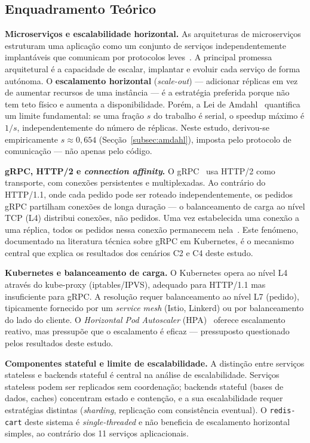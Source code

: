 \documentclass[acmsmall,screen=true,nonacm]{acmart}
\begin{document}
\subsection{Enquadramento Teórico}
\label{sec:teoria}

\textbf{Microserviços e escalabilidade horizontal.} As arquiteturas de microserviços estruturam uma aplicação como um conjunto de serviços independentemente implantáveis que comunicam por protocolos leves~\cite{fowler,newman}. A principal promessa arquitetural é a capacidade de escalar, implantar e evoluir cada serviço de forma autónoma. O \textbf{escalamento horizontal} (\textit{scale-out}) — adicionar réplicas em vez de aumentar recursos de uma instância — é a estratégia preferida porque não tem teto físico e aumenta a disponibilidade. Porém, a Lei de Amdahl~\cite{amdahl} quantifica um limite fundamental: se uma fração $s$ do trabalho é serial, o speedup máximo é $1/s$, independentemente do número de réplicas. Neste estudo, derivou-se empiricamente $s \approx 0{,}654$ (Secção~\ref{subsec:amdahl}), imposta pelo protocolo de comunicação — não apenas pelo código.

\textbf{gRPC, HTTP/2 e \textit{connection affinity}.} O gRPC~\cite{grpc} usa HTTP/2 como transporte, com conexões persistentes e multiplexadas. Ao contrário do HTTP/1.1, onde cada pedido pode ser roteado independentemente, os pedidos gRPC partilham conexões de longa duração — o balanceamento de carga ao nível TCP (L4) distribui conexões, não pedidos. Uma vez estabelecida uma conexão a uma réplica, todos os pedidos nessa conexão permanecem nela~\cite{grpcloadbalancing,k8sgrpc}. Este fenómeno, documentado na literatura técnica sobre gRPC em Kubernetes, é o mecanismo central que explica os resultados dos cenários C2 e C4 deste estudo.

\textbf{Kubernetes e balanceamento de carga.} O Kubernetes opera ao nível L4 através do kube-proxy (iptables/IPVS), adequado para HTTP/1.1 mas insuficiente para gRPC. A resolução requer balanceamento ao nível L7 (pedido), tipicamente fornecido por um \textit{service mesh} (Istio, Linkerd) ou por balanceamento do lado do cliente. O \textit{Horizontal Pod Autoscaler} (HPA)~\cite{k8shpa} oferece escalamento reativo, mas pressupõe que o escalamento é eficaz — pressuposto questionado pelos resultados deste estudo.

\textbf{Componentes stateful e limite de escalabilidade.} A distinção entre serviços stateless e backends stateful é central na análise de escalabilidade. Serviços stateless podem ser replicados sem coordenação; backends stateful (bases de dados, caches) concentram estado e contenção, e a sua escalabilidade requer estratégias distintas (\textit{sharding}, replicação com consistência eventual). O \texttt{redis-cart} deste sistema é \textit{single-threaded} e não beneficia de escalamento horizontal simples, ao contrário dos 11 serviços aplicacionais.
\end{document}
